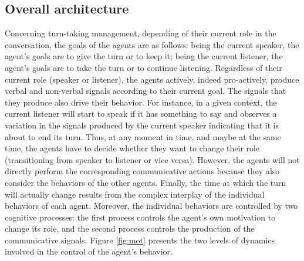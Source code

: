 \documentclass[twocolumn]{svjour3}
\begin{document}
\subsection{Overall architecture}

Concerning turn-taking management, depending of their current role in the conversation, the goals of the agents are as follows: being the current speaker, the agent's goals are to give the turn or to keep it; being the current listener, the agent's goals are to take the turn or to continue listening. Regardless of their current role (speaker or listener), the agents actively, indeed pro-actively, produce verbal and non-verbal signals according to their current goal. 
The signals that they produce also drive their behavior. For instance, in a given context, the current listener will start to speak if it has something to say and observes a variation in the signals produced by the current speaker indicating that it is about to end its turn. 
Thus, at any moment in time, and maybe at the same time, the agents have to decide whether they want to change their role (transitioning from speaker to listener or vice versa). However, the agents will not directly perform the corresponding communicative actions because they also consider the behaviors of the other agents. 
Finally, the time at which the turn will actually change results from the complex interplay of the individual behaviors of each agent. Moreover, the individual behaviors are controlled by two cognitive processes: the first process controls the agent's own motivation to change its role, and the second process controls the production of the communicative signals. 
Figure \ref{fig:mot} presents the two levels of dynamics involved in the control of the agent's behavior.
\end{document}
